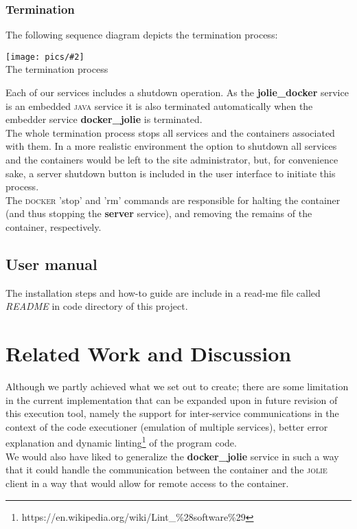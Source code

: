 \documentclass[12pt]{article}
\newcommand{\img}[3] {
	\begin{center}
	\texttt{[image: pics/\#2]}\\
	{\small #3}
	\end{center}
}
\newcommand{\docker}[0] {\textsc{docker}}
\newcommand{\jolie}[0] {\textsc{jolie}}
\newcommand{\java} {\textsc{java}}
\begin{document}
\subsubsection{Termination}
The following sequence diagram depicts the termination process:
\img{0.6}{term}{The termination process}
Each of our services includes a shutdown operation. As the \textbf{jolie\_docker} service is an embedded \java{} service it is also terminated automatically when the embedder service \textbf{docker\_jolie} is terminated. \\

\noindent{}The whole termination process stops all services and the containers associated with them. In a more realistic environment the option to shutdown all services and the containers would be left to the site administrator, but, for convenience sake, a server shutdown button is included in the user interface to initiate this process.\\

\noindent{}The \docker{} 'stop' and 'rm' commands are responsible for halting the container (and thus stopping the \textbf{server} service), and removing the remains of the container, respectively.

\subsection{User manual}
The installation steps and how-to guide are include in a read-me file called \textit{README} in code directory of this project.

\section{Related Work and Discussion}

Although we partly achieved what we set out to create; there are some limitation in the current implementation that can be expanded upon in future revision of this execution tool, namely the support for inter-service communications in the context of the code executioner (emulation of multiple services), better error explanation and dynamic linting\footnote{https://en.wikipedia.org/wiki/Lint\_\%28software\%29} of the program code.\\

\noindent{}We would also have liked to generalize the \textbf{docker\_jolie} service in such a way that it could handle the communication between the container and the \jolie{} client in a way that would allow for remote access to the container.

\newpage
 

\end{document}
